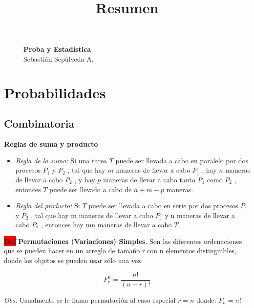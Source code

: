 \documentclass[letterpaper,10.5pt,twocolumn]{article} %
\title{\bfseries Resumen}
\author{}
\date{}
\newcommand{\hlc}[2][yellow]{ \colorbox{#1}{#2} }
\newcommand{\Def}{\hlc[red]{\bfseries Def}}
\let\oldfrac=\frac
\renewcommand{\frac}[2]{\ensuremath{\oldfrac{#1}{#2}}}
\begin{document}
\begin{figure}
\centering
\begin{minipage}[c]{0.4\textwidth}
\centering
\vspace{0.3cm}
{\bfseries \LARGE Proba y Estadística}
\vspace{0.2cm}\\
\footnotesize Sebastián Sepúlveda A.
\end{minipage}
\end{figure}


\section{Probabilidades}
\subsection{Combinatoria}

\textbf{Reglas de suma y producto} 
\begin{itemize}
    \item \textit{Regla de la suma:} Si una tarea $T$ puede ser llevada a cabo en paralelo por dos procesos $P_1$ y $P_2$ , tal que hay $m$ maneras de llevar a cabo $P_1$ , hay $n$ maneras de llevar a cabo $P_2$ , y hay $p$ maneras de llevar a cabo tanto $P_1$ como $P_2$ , entonces $T$ puede ser llevado a cabo de $n + m - p$ maneras.
    \item \textit{Regla del producto:} Si $T$ puede ser llevada a cabo en serie por dos procesos $P_1$ y $P_2$ , tal que hay m maneras de llevar a cabo $P_1$ y n maneras de llevar a cabo $P_2$ , entonces hay mn maneras de llevar a cabo $T$.
\end{itemize}


\Def \textbf{Permutaciones (Variaciones) Simples}. Son las diferentes ordenaciones que se pueden hacer en un arreglo de tamaño r con n elementos distinguibles, donde los objetos se pueden usar sólo una vez.

\begin{equation*}
    P_{r}^{n} = \frac{n!}{(n-r)!}
\end{equation*}

\textit{Obs:} Usualmente se le llama permutación al caso especial
$r = n$ donde: $P_n=n! $
\\
\end{document}
